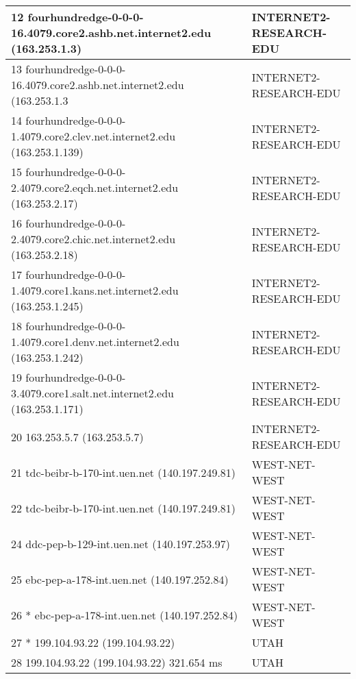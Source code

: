 \begin{table}[!ht]
\begin{tabular}{|l|l|}
12  fourhundredge-0-0-0-16.4079.core2.ashb.net.internet2.edu (163.253.1.3)  & INTERNET2-RESEARCH-EDU           \\ \hline
13  fourhundredge-0-0-0-16.4079.core2.ashb.net.internet2.edu (163.253.1.3   & INTERNET2-RESEARCH-EDU           \\ \hline
14  fourhundredge-0-0-0-1.4079.core2.clev.net.internet2.edu (163.253.1.139) & INTERNET2-RESEARCH-EDU           \\ \hline
15  fourhundredge-0-0-0-2.4079.core2.eqch.net.internet2.edu (163.253.2.17)  & INTERNET2-RESEARCH-EDU           \\ \hline
16  fourhundredge-0-0-0-2.4079.core2.chic.net.internet2.edu (163.253.2.18)  & INTERNET2-RESEARCH-EDU           \\ \hline
17  fourhundredge-0-0-0-1.4079.core1.kans.net.internet2.edu (163.253.1.245) & INTERNET2-RESEARCH-EDU           \\ \hline
18  fourhundredge-0-0-0-1.4079.core1.denv.net.internet2.edu (163.253.1.242) & INTERNET2-RESEARCH-EDU           \\ \hline
19  fourhundredge-0-0-0-3.4079.core1.salt.net.internet2.edu (163.253.1.171) & INTERNET2-RESEARCH-EDU           \\ \hline
20  163.253.5.7 (163.253.5.7)                                               & INTERNET2-RESEARCH-EDU           \\ \hline
21  tdc-beibr-b-170-int.uen.net (140.197.249.81)                            & WEST-NET-WEST                    \\ \hline
22  tdc-beibr-b-170-int.uen.net (140.197.249.81)                            & WEST-NET-WEST                    \\ \hline
24  ddc-pep-b-129-int.uen.net (140.197.253.97)                              & WEST-NET-WEST                    \\ \hline
25  ebc-pep-a-178-int.uen.net (140.197.252.84)                              & WEST-NET-WEST                    \\ \hline
26  * ebc-pep-a-178-int.uen.net (140.197.252.84)                            & WEST-NET-WEST                    \\ \hline
27  * 199.104.93.22 (199.104.93.22)                                         & UTAH                                                                            \\ \hline
28  199.104.93.22 (199.104.93.22)  321.654 ms                               & UTAH                                                                            \\ \hline

\end{tabular}
\end{table}
